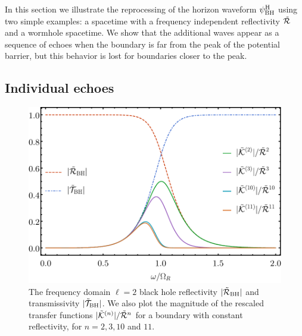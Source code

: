 \begin{refsection}
In this section we illustrate the reprocessing of the horizon waveform $\psi^{\rm H}_{\rm BH}$ using two simple examples: a spacetime with a frequency independent reflectivity $\tilde{\mathcal R}$ and a wormhole spacetime.
We show that the additional waves appear as a sequence of echoes when the boundary is far from the peak of the potential barrier, but this behavior is lost for boundaries closer to the peak.

\subsection{Individual echoes}

\begin{figure}[t]
\includegraphics[width =1 \columnwidth]{chapter_echo/etc/RTK.pdf}
\caption{
The frequency domain $\ell =2$ black hole reflectivity $|\tilde{\mathcal R}_{\rm BH}|$ and transmissivity $|\tilde{\mathcal T}_{\rm BH}|$. We also plot the magnitude of the rescaled transfer functions $|\tilde{\mathcal K}^{(n)}|/\tilde{\mathcal R}^n$ for a boundary with constant reflectivity, for $n=2,3,10$ and $11$. 
}
\label{fig:ConstantRtransfer}
\end{figure}


\end{refsection}
